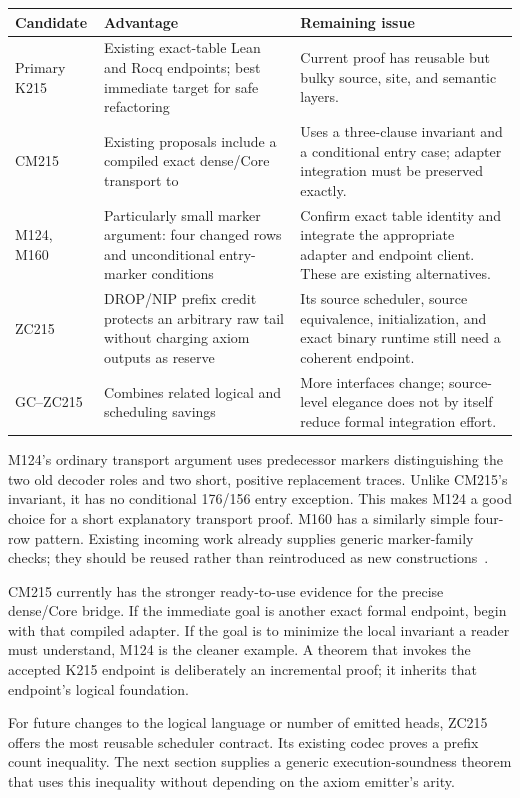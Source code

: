 \documentclass[11pt]{article}
\newcommand{\code}[1]{\texttt{\detokenize{#1}}}
\begin{document}
\begin{longtable}{@{}P{0.18\textwidth}P{0.38\textwidth}P{0.38\textwidth}@{}}
\toprule
Candidate & Advantage & Remaining issue\\
\midrule\endhead
Primary K215 & Existing exact-table Lean and Rocq endpoints; best immediate target for safe refactoring & Current proof has reusable but bulky source, site, and semantic layers.\\
CM215 & Existing proposals include a compiled exact dense/Core transport to \code{KDense215.machine215} & Uses a three-clause invariant and a conditional entry case; adapter integration must be preserved exactly.\\
M124, M160 & Particularly small marker argument: four changed rows and unconditional entry-marker conditions & Confirm exact table identity and integrate the appropriate adapter and endpoint client. These are existing alternatives.\\
ZC215 & DROP/NIP prefix credit protects an arbitrary raw tail without charging axiom outputs as reserve & Its source scheduler, source equivalence, initialization, and exact binary runtime still need a coherent endpoint.\\
GC--ZC215 & Combines related logical and scheduling savings & More interfaces change; source-level elegance does not by itself reduce formal integration effort.\\
\bottomrule
\end{longtable}

M124's ordinary transport argument uses predecessor markers distinguishing the two old decoder roles and two short, positive replacement traces. Unlike CM215's invariant, it has no conditional 176/156 entry exception. This makes M124 a good choice for a short explanatory transport proof. M160 has a similarly simple four-row pattern. Existing incoming work already supplies generic marker-family checks; they should be reused rather than reintroduced as new constructions~\cite{markers,proposals}.

CM215 currently has the stronger ready-to-use evidence for the precise dense/Core bridge. If the immediate goal is another exact formal endpoint, begin with that compiled adapter. If the goal is to minimize the local invariant a reader must understand, M124 is the cleaner example. A theorem that invokes the accepted K215 endpoint is deliberately an incremental proof; it inherits that endpoint's logical foundation.

For future changes to the logical language or number of emitted heads, ZC215 offers the most reusable scheduler contract. Its existing codec proves a prefix count inequality. The next section supplies a generic execution-soundness theorem that uses this inequality without depending on the axiom emitter's arity.
\end{document}
